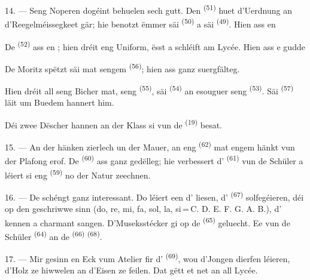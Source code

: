 14. --- Seng Noperen dogéint behuelen sech gutt. Den 
\textsuperscript{(51)} huet d'Uerdnung an d'Reegelméissegkeet gär; hie benotzt ëmmer
säi  \textsuperscript{(50)} a säi 
\textsuperscript{(49)}. Hien ass en 

De  \textsuperscript{(52)} ass en ; hien dréit
eng Uniform, ësst a schléift am Lycée. Hien ass e gudde 

De Moritz spëtzt säi  mat sengem 
\textsuperscript{(56)}; hien ass ganz suergfälteg.

Hien dréit all seng Bicher mat, seng  \textsuperscript{(55)}, säi
 \textsuperscript{(54)} an esouguer seng 
\textsuperscript{(53)}. Säi  \textsuperscript{(57)} läit um Buedem
hannert him.

Déi zwee Dëscher hannen an der Klass si vun de 
\textsuperscript{(19)} besat.

\VUsaut{4.6mm}
\VUsaut{3.4mm}

15. --- An der  hänken zierlech  un der Mauer, an
eng  \textsuperscript{(62)} mat engem  hänkt vun der
Plafong erof. De  \textsuperscript{(60)} ass ganz gedëlleg; hie
verbessert d' \textsuperscript{(61)} vun de Schüler a léiert si
eng  \textsuperscript{(59)} no der Natur zeechnen.

16. --- De  schéngt ganz interessant. Do léiert een d'
liesen, d' \textsuperscript{(67)} solfegéieren, déi op den
 geschriwwe sinn (do, re, mi, fa, sol, la,
si\,=\,C. D. E. F. G. A. B.), d' kennen a charmant
 sangen. D'Museksstécker gi op de 
\textsuperscript{(65)} geluecht. Ee vun de Schüler 
\textsuperscript{(64)} an de  \textsuperscript{(66)}
 \textsuperscript{(68)}.

17. --- Mir gesinn en Eck vum Atelier fir d'
\textsuperscript{(69)}, wou d'Jongen dierfen léieren, d'Holz ze hiwwelen an d'Eisen ze
feilen. Dat gëtt et net an all Lycée.

